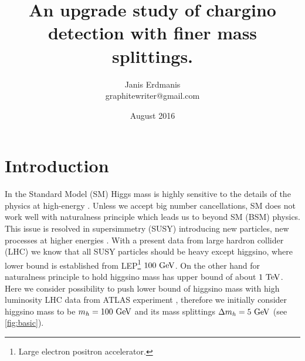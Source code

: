 \documentclass[tightenline,notitlepage,nofootinbib]{revtex4-1}
\begin{document}
  \title{An upgrade study of chargino detection with finer mass splittings.}
  \author{Janis Erdmanis \\ graphitewriter@gmail.com}
  \date{August 2016}
  \maketitle

  \section{Introduction}

  In the Standard Model (SM) Higgs mass is highly sensitive to the details of the physics at high-energy \cite{Barbieri}. Unless we accept big number cancellations, SM does not work well with naturalness principle which leads us to beyond SM (BSM) physics. This issue is resolved in supersimmetry (SUSY) introducing new particles, new processes at higher energies \cite{Carlos}. With a present data from large hardron collider (LHC) \cite{PhysRevD.93.052002} we know that all SUSY particles should be heavy except higgsino, where lower bound is established from LEP\footnote{Large electron positron accelerator.} $100~\rm{GeV}$. On the other hand for naturalness principle to hold higgsino mass has upper bound of about $1 ~\rm{TeV}$. Here we consider possibility to push lower bound of higgsino mass with high luminosity LHC data from ATLAS experiment \cite{HLLHC,ATLASCOL-2008}, therefore we initially consider higgsino mass to be $m_{h}=100~\rm{GeV}$ and its mass splittings $\Delta m_h = 5~\rm{GeV}$ (see \cref{fig:basic}).
\end{document}
